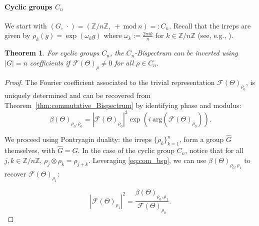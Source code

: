\documentclass{article}
\theoremstyle{plain}
\newtheorem{theorem}{Theorem}[section]
\theoremstyle{definition}
\theoremstyle{remark}
\begin{document}
\paragraph{Cyclic groups $C_n$} We start with $(G,\ \cdot)=(\mathbb{Z}/n\mathbb{Z},\ +\ \mathrm{mod}\ n)=:C_n$. Recall that the irreps are given by $\rho_k(g)=\exp\left(\omega_k g\right)$ where $\omega_k:=\frac{2\pi i k }{n}$ for $k\in\mathbb{Z}/n\mathbb{Z}$ (see, e.g., \citep{steinberg2011representation}).
\begin{theorem}{\citep{kakarala_finite_groups}}\label{thm:cyclic_inversion}
For cyclic groups $C_n$, the $C_n$-Bispectrum can be inverted using $|G|=n$ coefficients if $\mathcal{F}(\Theta)_\rho\neq 0$ for all $\rho \in C_n$.
\end{theorem}
\begin{proof}
The Fourier coefficient associated to the trivial representation $\mathcal{F}(\Theta)_{\rho_0}$, is uniquely determined and can be recovered from Theorem~\ref{thm:commutative_Bispectrum} by identifying phase and modulus:
\begin{equation}\label{eq:trivial_coef}
    \beta(\Theta)_{\rho_0,\rho_0} =|\mathcal{F}(\Theta)_{\rho_0}|^3\exp\left(i\ \mathrm{arg}(\mathcal{F}(\Theta)_{\rho_0})\right).
\end{equation}

We proceed using Pontryagin duality: the irreps $\{\rho_k\}_{k=1}^n$, form a group $\widehat{G}$ themselves, with $\widehat{G} = G$. In the case of the cyclic group $C_n$, notice that for all $j,k\in\mathbb{Z}/n\mathbb{Z}$, $\rho_j\otimes \rho_k = \rho_{j+k}$. Leveraging \eqref{eq:com_bsp}, we can use $\beta(\Theta)_{\rho_0,\rho_1}$ to recover $\mathcal{F}(\Theta)_{\rho_1}$:

\begin{equation}\label{eq:trivial_coeff_cyclic}
    |\mathcal{F}(\Theta)_{\rho_1}|^2 =\frac{\beta(\Theta)_{\rho_0,\rho_1}}{\mathcal{F}(\Theta)_{\rho_0}}.
\end{equation}


\end{proof}
\end{document}
